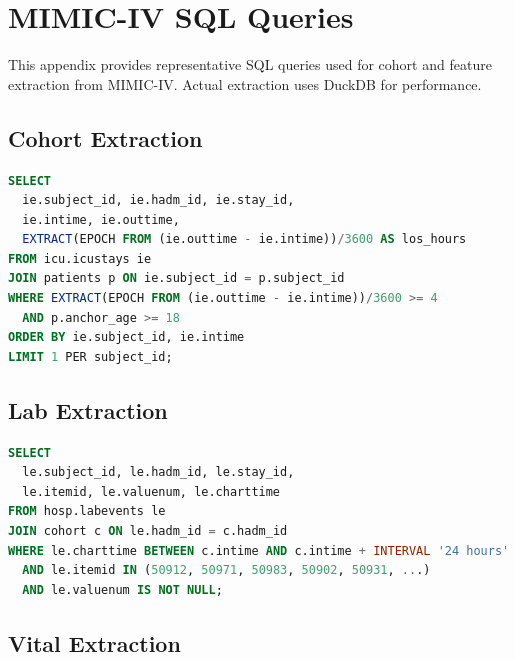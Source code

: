 \chapter{MIMIC-IV SQL Queries}
\label{app:sql}

This appendix provides representative SQL queries used for cohort and feature extraction from MIMIC-IV. Actual extraction uses DuckDB for performance.

\section{Cohort Extraction}

\begin{lstlisting}[language=SQL, caption={Cohort: First ICU Stay, Min 4h LOS}]
SELECT 
  ie.subject_id, ie.hadm_id, ie.stay_id,
  ie.intime, ie.outtime,
  EXTRACT(EPOCH FROM (ie.outtime - ie.intime))/3600 AS los_hours
FROM icu.icustays ie
JOIN patients p ON ie.subject_id = p.subject_id
WHERE EXTRACT(EPOCH FROM (ie.outtime - ie.intime))/3600 >= 4
  AND p.anchor_age >= 18
ORDER BY ie.subject_id, ie.intime
LIMIT 1 PER subject_id;
\end{lstlisting}

\section{Lab Extraction}

\begin{lstlisting}[language=SQL, caption=Labs from First 24h]
SELECT 
  le.subject_id, le.hadm_id, le.stay_id,
  le.itemid, le.valuenum, le.charttime
FROM hosp.labevents le
JOIN cohort c ON le.hadm_id = c.hadm_id
WHERE le.charttime BETWEEN c.intime AND c.intime + INTERVAL '24 hours'
  AND le.itemid IN (50912, 50971, 50983, 50902, 50931, ...)
  AND le.valuenum IS NOT NULL;
\end{lstlisting}

\section{Vital Extraction}

